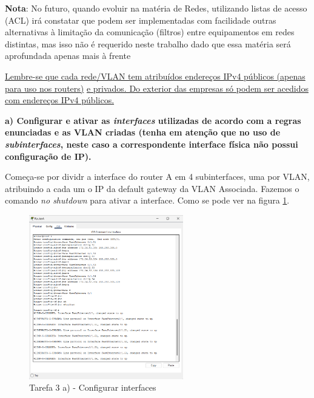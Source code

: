 \documentclass[11pt,english, openright, oneside]{book}
\begin{document}
\textbf{Nota}: No futuro, quando evoluir na matéria de Redes, utilizando listas de acesso (ACL) irá constatar que podem ser implementadas com facilidade outras alternativas à limitação da comunicação (filtros) entre equipamentos em redes distintas, mas isso não é requerido neste trabalho dado que essa matéria será aprofundada apenas mais à frente

\underline{Lembre-se que cada rede/VLAN tem atribuídos endereços IPv4 públicos (apenas para uso nos routers)}
\underline{e privados. Do exterior das empresas só podem ser acedidos com endereços IPv4 públicos.}

\vspace{0.8cm}

\textbf{a) Configurar e ativar as \textit{interfaces} utilizadas de acordo com a regras enunciadas e as VLAN criadas (tenha em atenção que no uso de \textit{subinterfaces}, neste caso a correspondente interface física não possui configuração de IP).}
\vspace{0.2cm}

Começa-se por dividr a interface do router A em 4 subinterfaces, uma por VLAN, atribuindo a cada um o IP da default gateway da VLAN Associada.
Fazemos o comando \textit{no shutdown} para ativar a interface. Como se pode ver na figura \ref{fig:3a}.
\vspace{0.2cm}

\begin{figure}[H]
    \centering
    \includegraphics[width=0.6\textwidth]{imagens/Tarefa3/3.a.png}
    \caption{Tarefa 3 a) - Configurar interfaces}
    \label{fig:3a}
\end{figure}

\vspace{0.8cm}
\end{document}
